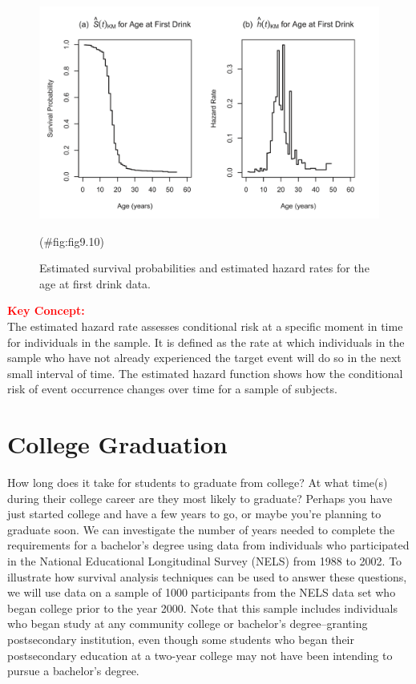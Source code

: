 \documentclass[
]{report}
\begin{document}
\begin{figure}

{\centering \includegraphics[width=1\linewidth]{docs/Fig9_10} 

}

\caption{Estimated survival probabilities and estimated hazard rates for the age at first drink data.}(\#fig:fig9.10)
\end{figure}

\large

\textbf{\textcolor{red}{Key Concept:}}\\
\color{red}
The estimated hazard rate assesses conditional risk at a specific moment in time for individuals in the sample. It is defined as the rate at which individuals in the sample who have not already experienced the target event will do so in the next small interval of time. The estimated hazard function shows how the conditional risk of event occurrence changes over time for a sample of subjects.\\
\color{black}
\normalsize

\section*{College Graduation}\label{college-graduation}

How long does it take for students to graduate from college? At what time(s) during their college career are they most likely to graduate? Perhaps you have just started college and have a few years to go, or maybe you're planning to graduate soon. We can investigate the number of years needed to complete the requirements for a bachelor's degree using data from individuals who participated in the National Educational Longitudinal Survey (NELS) from 1988 to 2002. To illustrate how survival analysis techniques can be used to answer these questions, we will use data on a sample of 1000 participants from the NELS data set who began college prior to the year 2000. Note that this sample includes individuals who began study at any community college or bachelor's degree--granting postsecondary institution, even though some students who began their postsecondary education at a two-year college may not have been intending to pursue a bachelor's degree.
\end{document}
